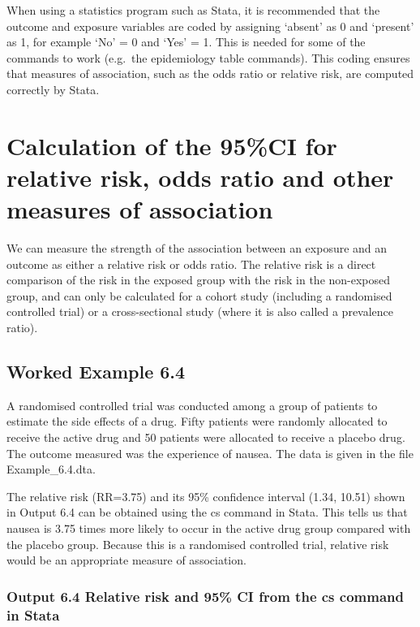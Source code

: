 \documentclass[
]{memoir}
\begin{document}
When using a statistics program such as Stata, it is recommended that the outcome and exposure variables are coded by assigning `absent' as 0 and `present' as 1, for example `No' = 0 and `Yes' = 1. This is needed for some of the commands to work (e.g.~the epidemiology table commands). This coding ensures that measures of association, such as the odds ratio or relative risk, are computed correctly by Stata.

\hypertarget{calculation-of-the-95ci-for-relative-risk-odds-ratio-and-other-measures-of-association}{%
\section{Calculation of the 95\%CI for relative risk, odds ratio and other measures of association}\label{calculation-of-the-95ci-for-relative-risk-odds-ratio-and-other-measures-of-association}}

We can measure the strength of the association between an exposure and an outcome as either a relative risk or odds ratio. The relative risk is a direct comparison of the risk in the exposed group with the risk in the non-exposed group, and can only be calculated for a cohort study (including a randomised controlled trial) or a cross-sectional study (where it is also called a prevalence ratio).

\hypertarget{worked-example-6.4}{%
\subsection{Worked Example 6.4}\label{worked-example-6.4}}

A randomised controlled trial was conducted among a group of patients to estimate the side effects of a drug. Fifty patients were randomly allocated to receive the active drug and 50 patients were allocated to receive a placebo drug. The outcome measured was the experience of nausea. The data is given in the file Example\_6.4.dta.

The relative risk (RR=3.75) and its 95\% confidence interval (1.34, 10.51) shown in Output 6.4 can be obtained using the cs command in Stata. This tells us that nausea is 3.75 times more likely to occur in the active drug group compared with the placebo group. Because this is a randomised controlled trial, relative risk would be an appropriate measure of association.

\hypertarget{output-6.4-relative-risk-and-95-ci-from-the-cs-command-in-stata}{%
\subsubsection{Output 6.4 Relative risk and 95\% CI from the cs command in Stata}\label{output-6.4-relative-risk-and-95-ci-from-the-cs-command-in-stata}}
\end{document}
